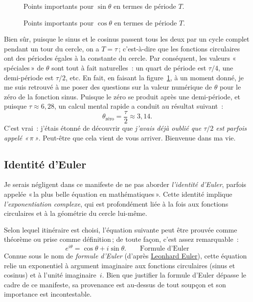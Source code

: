 \begin{figure}
\begin{center}
\end{center}
\caption{Points importants pour $\sin\theta$ en termes de période
$T$.\label{fig:sine_with_tau}}
\end{figure}

\begin{figure}
\begin{center}
\end{center}
\caption{Points importants pour $\cos\theta$ en termes de période
$T$.\label{fig:cosine_with_tau}}
\end{figure}

Bien sûr, puisque le sinus et le cosinus passent tous les deux par un cycle
complet pendant un tour du cercle, on a $T = \tau$\,; c'est-à-dire que les
fonctions circulaires ont des périodes égales à la constante du cercle. Par
conséquent, les valeurs «\,spéciales\,»  de $\theta$ sont tout à fait
naturelles~: un quart de période est $\tau/4$, une demi-période est $\tau/2$,
etc. En fait, en faisant la figure~\ref{fig:sine_with_tau}, à un moment donné,
je me suis retrouvé à me poser des questions sur la valeur numérique de $\theta$
pour le zéro de la fonction sinus. Puisque le zéro se produit après une
demi-période, et puisque $\tau \approx 6{,}28$, un calcul mental rapide a
conduit au résultat suivant~:
\[
  \theta_\mathrm{zéro} = \frac{\tau}{2} \approx 3{,}14.
\]
C'est vrai~: j'étais étonné de découvrir que \emph{j'avais déjà oublié que
$\tau/2$ est parfois appelé «\,$\pi$\,»}. Peut-être que cela vient de vous
arriver. Bienvenue dans ma vie.



   \subsection{Identité d'Euler} %
   \label{sec:euler_s_identity}

Je serais négligent dans ce manifeste de ne pas aborder \emph{l'identité
d'Euler}, parfois appelée «\,la plus belle équation en mathématiques\,». Cette
identité implique \emph{l'exponentiation complexe}, qui est profondément liée à
la fois aux fonctions circulaires et à la géométrie du cercle lui-même.

Selon lequel itinéraire est choisi, l'équation suivante peut être prouvée comme
théorème ou prise comme définition\,; de toute façon, c'est assez remarquable~:
\begin{equation}
\label{eq:eulers_formula}
e^{i\theta} = \cos\theta + i\sin\theta. \qquad\mbox{Formule d'Euler}
\end{equation}
Connue sous le nom de \emph{formule d'Euler} (d'après
\href{https://en.wikipedia.org/wiki/Leonhard_Euler}{Leonhard Euler}), cette
équation relie un exponentiel à argument imaginaire aux fonctions circulaires
(sinus et cosinus) et à l'unité imaginaire~$i$. Bien que justifier la formule
d'Euler dépasse le cadre de ce manifeste, sa provenance est au-dessus de tout
soupçon et son importance est incontestable.

